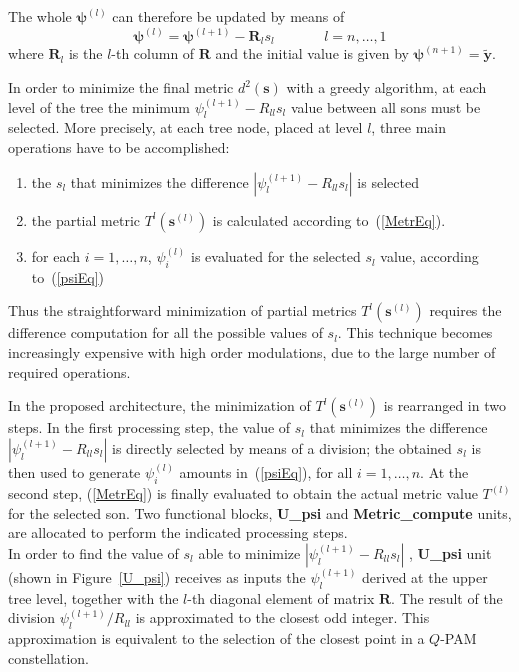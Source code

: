 \documentclass[12pt,onecolumn,draftclsnofoot]{IEEEtran}
\begin{document}
The whole $\boldsymbol{\psi}^{(l)}$ can therefore be updated by means of 
\begin{equation}                                                       \boldsymbol{\psi}^{(l)}= \boldsymbol{\psi}^{(l+1)}- \boldsymbol{R}_l s_l  ~~~~~~~~~~~~~~~~l = n, \dots , 1 \label{boldpsieq}                                                         \end{equation}   
 \noindent where $\boldsymbol{R}_l$ is the $l$-th column of $\boldsymbol{R}$
and the initial value is given by                                   $\boldsymbol{\psi}^{(n+1)}=\boldsymbol{\tilde{y}}$.

In order to minimize the
final metric $d^2(\boldsymbol{s})$ with a greedy algorithm, at each level of the tree the
minimum $\psi_l^{(l+1)}-R_{ll}s_l$ value between all sons must be
selected. More precisely,
at each tree node, placed at level $l$, three main operations have to be accomplished:
\begin{enumerate}
\item the $s_l$ that minimizes the difference $|\psi_l^{(l+1)} - R_{ll} s_{l}|$ is selected
\item the partial metric $T^{l}(\boldsymbol{s}^{(l)})$ is calculated according to~(\ref{MetrEq}).
\item for each $i = 1, \ldots, n$, $\psi_i^{(l)}$ is evaluated for the selected $s_l$ value,
according to~(\ref{psiEq})
\end{enumerate}
Thus the straightforward minimization of partial metrics $T^{l}(\boldsymbol{s}^{(l)})$
requires the difference computation for all
the possible values of $s_l$. This technique becomes increasingly expensive 
with high order modulations, due to the large number of required
operations. 

In the proposed architecture, the minimization of $T^{l}(\boldsymbol{s}^{(l)})$
is rearranged in two steps. 
In the first processing step, the value of $s_l$ that minimizes
the difference $|\psi_l^{(l+1)}-R_{ll}s_l|$ is directly selected by means of a division;
the obtained $s_l$ is then used to generate $\psi_i^{(l)}$ amounts in~(\ref{psiEq}),
for all $i = 1, \ldots, n$.
At the second step, 
(\ref{MetrEq}) is finally evaluated  to obtain the actual metric
value $T^{(l)}$ for the selected son.
Two functional blocks, \textbf{U\_psi}
and \textbf{Metric\_compute} units, are allocated to perform the indicated 
processing steps.\\

In order to find the value of $s_l$ able to
minimize $|\psi_l^{(l+1)}-R_{ll}s_l|$ , \textbf{U\_psi} unit (shown in Figure~\ref{U_psi}) 
receives as inputs the
$\psi_l^{(l+1)}$ derived at the upper tree level, together with the
$l$-th diagonal element of matrix $\boldsymbol{R}$. The result of the division 
$\psi_l^{(l+1)} / R_{ll}$ is approximated to the closest odd integer.
This approximation is equivalent to the selection of the closest
point in a $Q$-PAM  constellation. 
\end{document}
